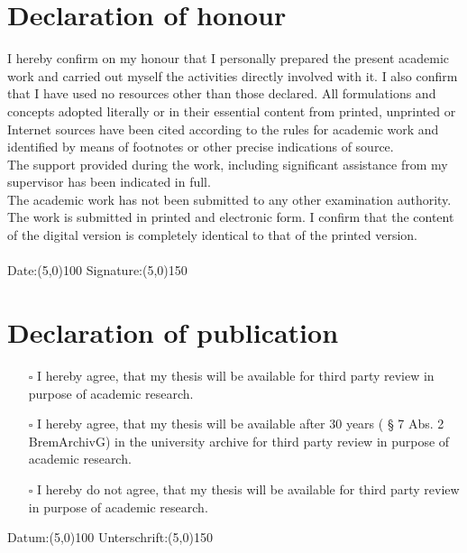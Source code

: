 \section*{Declaration of honour} 
I hereby confirm on my honour that I personally prepared the present academic 
work and carried out myself the activities directly involved with it. I also 
confirm that I have used no resources other than those declared. All formulations 
and concepts adopted literally or in their essential content from printed, unprinted 
or Internet sources have been cited according to the rules for academic work and 
identified by means of footnotes or other precise indications of source.
\\
The support provided during the work, including significant assistance from my
supervisor has been indicated in full.
\\
The academic work has not been submitted to any other examination authority. 
The work is submitted in printed and electronic form. I confirm that the
content of the digital version is completely identical to that of the printed version.\\
\\
Date:\line(5,0){100} \hfill Signature:\line(5,0){150}
\section*{Declaration of publication}
\begin{itemize}
\item[$\square$]I hereby agree, that my thesis will be available for third party review in
purpose of academic research.
\item[$\square$]I hereby agree, that my thesis will be available after 30 years ( § 7 Abs. 2
BremArchivG) in the university archive for third party review in purpose
of academic research.
\item[$\square$]I hereby do not agree, that my thesis will be available for third party
review in purpose of academic research.
\end{itemize}
Datum:\line(5,0){100} \hfill Unterschrift:\line(5,0){150}